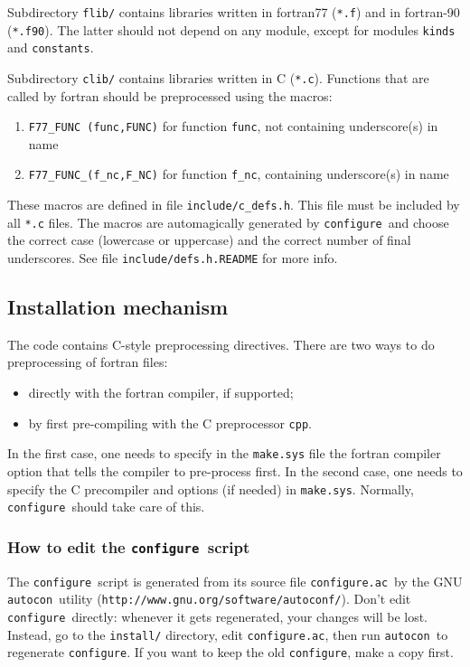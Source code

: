 \documentclass[12pt,a4paper]{article}
\def\configure{\texttt{configure}}
\def\configurac{\texttt{configure.ac}}
\def\autoconf{\texttt{autocon}}
\begin{document}
Subdirectory \texttt{flib/} contains libraries written in fortran77 
(\texttt{*.f}) and in fortran-90 (\texttt{*.f90}).
The latter should not depend on any module, except for modules
\texttt{kinds} and \texttt{constants}.

Subdirectory \texttt{clib/} contains libraries written in C 
(\texttt{*.c}). Functions that are called by fortran
should be preprocessed using the macros:
\begin{enumerate}
\item \texttt{F77\_FUNC (func,FUNC)} for function \texttt{func}, not containing underscore(s) in name 
\item \texttt{F77\_FUNC\_(f\_nc,F\_NC)} for function \texttt{f\_nc}, containing underscore(s) in name
\end{enumerate}
These macros are defined in file \texttt{include/c\_defs.h}. This file must be included
by all \texttt{*.c} files. The macros are automagically generated by 
\configure\ and 
choose the correct case 
(lowercase or uppercase) and the correct number of final underscores. 
See file \texttt{include/defs.h.README} for more info.

\subsection{Installation mechanism}

\label{SubSec:Inst}
The code contains C-style preprocessing directives. There are two ways to do preprocessing of fortran files:
\begin{itemize}
\item directly with the fortran compiler, if supported;
\item by first pre-compiling with the C preprocessor \texttt{cpp}.
\end{itemize}

In the first case, one needs to specify in the \texttt{make.sys} file the fortran compiler option that tells the compiler to pre-process first. In the second case, one needs to
specify the C precompiler and options (if needed) in \texttt{make.sys}.
Normally, \configure\ should take care of this.

\subsubsection{ How to edit the \configure\ script}

The \configure\ script is generated from its source file
\configurac\ by the GNU \autoconf\ utility
(\texttt{http://www.gnu.org/software/autoconf/}).  Don't edit \configure\
directly: whenever it gets regenerated, your changes will be lost.
Instead, go to the \texttt{install/} directory, edit \configurac, 
then run \autoconf\ to regenerate \configure. If you want 
to keep the old \configure, make a copy
first.
\end{document}
